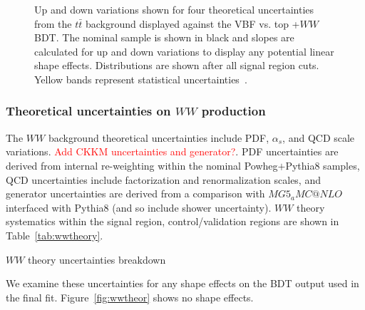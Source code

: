 \begin{figure}[!h]
{  }%
{\caption{Up and down variations shown for four theoretical uncertainties from the $t\bar{t}$ background displayed against the VBF vs. top +$WW$ BDT. The nominal sample is shown in black and slopes are calculated for up and down variations to display any potential linear shape effects. Distributions are shown after all signal region cuts. Yellow bands represent statistical uncertainties~\cite{ourSupportNote}.
\label{fig:ttbartheory}}}
\end{figure}

\subsubsection{Theoretical uncertainties on $WW$ production}

The $WW$ background theoretical uncertainties include PDF, $\alpha_s$, and QCD scale variations. \textcolor{red}{Add CKKM uncertainties and generator?}. PDF uncertainties are derived from internal re-weighting within the nominal Powheg$+$Pythia8 samples, QCD uncertainties include factorization and renormalization scales, and generator uncertainties are derived from a comparison with $MG5_aMC@NLO$ interfaced with Pythia8 (and so include shower uncertainty). $WW$ theory systematics within the signal region, control/validation regions are shown in Table~\ref{tab:wwtheory}.

\begin{table}[h!]
\centering
\scalebox{1.0}{

}
\caption{$WW$ theory uncertainties breakdown}
\label{tab:wwtheory}
\end{table}

We examine these uncertainties for any shape effects on the BDT output used in the final fit. Figure~\ref{fig:wwtheor} shows no shape effects.

